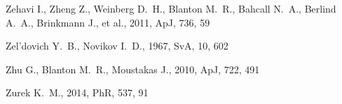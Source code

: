 \documentclass[fleqn,12pt]{article}
\begin{document}
\begin{thebibliography}{}
 Zehavi I., Zheng Z., Weinberg D.~H., Blanton M.~R., Bahcall N.~A., Berlind A.~A., Brinkmann J., et al., 2011, ApJ, 736, 59

 Zel'dovich Y.~B., Novikov I.~D., 1967, SvA, 10, 602

 Zhu G., Blanton M.~R., Moustakas J., 2010, ApJ, 722, 491

 Zurek K.~M., 2014, PhR, 537, 91

\end{thebibliography}
\label{lastpage}
\end{document}
